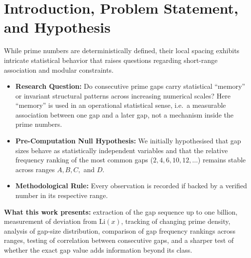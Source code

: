 \documentclass[12pt,a4paper]{article}
\begin{document}
\section{Introduction, Problem Statement, and Hypothesis}
While prime numbers are deterministically defined, their local spacing exhibits intricate statistical behavior that raises questions regarding short-range association and modular constraints.
\begin{itemize}
    \item \textbf{Research Question:} Do consecutive prime gaps carry statistical ``memory'' or invariant structural patterns across increasing numerical scales? Here ``memory'' is used in an operational statistical sense, i.e.\ a measurable association between one gap and a later gap, not a mechanism inside the prime numbers.
    \item \textbf{Pre-Computation Null Hypothesis:} We initially hypothesised that gap sizes behave as statistically independent variables and that the relative frequency ranking of the most common gaps ($2, 4, 6, 10, 12, \dots$) remains stable across ranges $A, B, C,$ and $D$.
    \item \textbf{Methodological Rule:} Every observation is recorded if backed by a verified number in its respective range.
\end{itemize}
\noindent \textbf{What this work presents:} extraction of the gap sequence up to one billion, measurement of deviation from $\mathrm{Li}(x)$, tracking of changing prime density, analysis of gap-size distribution, comparison of gap frequency rankings across ranges, testing of correlation between consecutive gaps, and a sharper test of whether the exact gap value adds information beyond its class.
\end{document}
